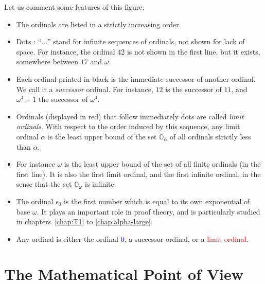 Let us comment some features of this figure:

\begin{itemize}
\item The ordinals are listed in a strictly increasing order. 
\item Dots : ``$\ldots$'' stand for  infinite sequences of ordinals, not shown for lack of space. For instance, the ordinal $42$ is not shown in the first line, but it exists, somewhere between $17$ and $\omega$.
\item Each ordinal printed in black is the immediate successor of another ordinal. We call it a \emph{successor} ordinal. For instance, $12$ is the successor of $11$, and $\omega^4+1$ the successor of $\omega^4$.
\item Ordinals (displayed in red)  that  follow immediately dots are called \emph{limit ordinals}. With respect to the order induced by this sequence, any limit ordinal $\alpha$ is the least upper bound of  the set $\mathbb{O}_\alpha$ of all ordinals strictly less than $\alpha$.
\item
For instance $\omega$ is the least upper bound of the set of all finite ordinals (in the first line). It is also the first limit ordinal, and the first infinite ordinal, in the sense that 
the set $\mathbb{O}_\omega$ is infinite.
\item The ordinal $\epsilon_0$ is the first number which is equal to its own exponential of base $\omega$. It plays an important role in proof theory, and is particularly studied in chapters~\ref{chap:T1} to \ref{chap:alpha-large}.
\item Any ordinal is  either the ordinal \textcolor{blue}{$0$},
a successor ordinal, or a \textcolor{red}{limit ordinal}.
\end{itemize}




\section{The Mathematical Point of View}

